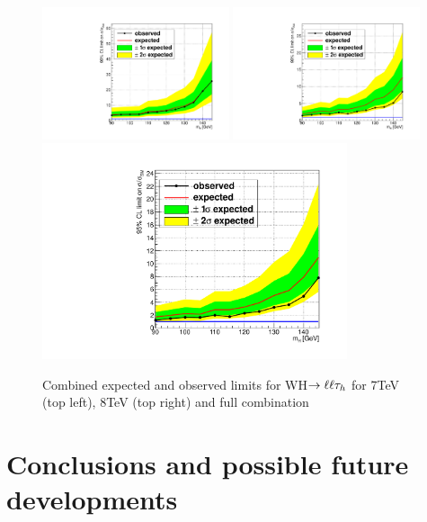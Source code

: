 \begin{figure}
\begin{center}
  \includegraphics[width=0.49\textwidth]{4_Analisys/pics/limits/vhtt_wh/vhtt_wh_7TeV.pdf}
  \includegraphics[width=0.49\textwidth]{4_Analisys/pics/limits/vhtt_wh/vhtt_wh_8TeV.pdf}\\
  \includegraphics[width=0.8\textwidth]{4_Analisys/pics/limits/vhtt_wh/vhtt_wh.pdf}
  \caption{Combined expected and observed limits for WH$\rightarrow\ell\ell\tau_h$ for 7TeV (top left), 8TeV (top right) and full combination}
  \label{fig:llt_limits}
\end{center}
\end{figure}

\chapter{Conclusions and possible future developments}

